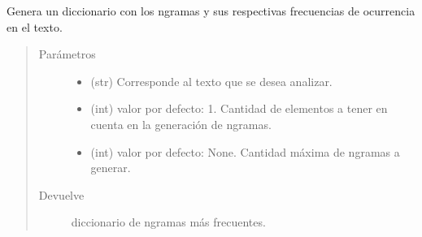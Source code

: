 \documentclass[letterpaper,10pt,openany,spanish]{sphinxmanual}
\begin{document}
\begin{fulllineitems}
\label{\detokenize{funciones/exploracion:exploracion.frecuencia_ngramas}}
Genera un diccionario con los n\sphinxhyphen{}gramas y sus respectivas frecuencias de ocurrencia en el texto.
\begin{quote}\begin{description}
\item[{Parámetros}] \leavevmode\begin{itemize}
\item {} 
 \textendash{} (str) Corresponde al texto que se desea analizar.

\item {} 
 \textendash{} (int) valor por defecto: 1. Cantidad de elementos a tener en cuenta en la generación de n\sphinxhyphen{}gramas.

\item {} 
 \textendash{} (int) valor por defecto: None. Cantidad máxima de n\sphinxhyphen{}gramas a generar.

\end{itemize}

\item[{Devuelve}] \leavevmode
diccionario de n\sphinxhyphen{}gramas más frecuentes.

\end{description}\end{quote}

\end{fulllineitems}

\end{document}
